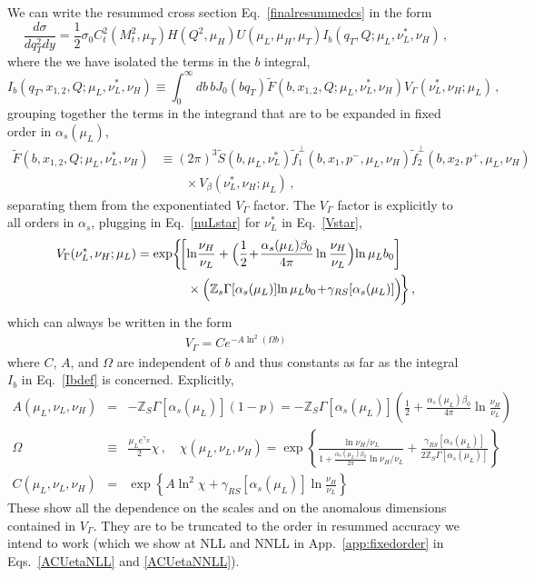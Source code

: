 \documentclass[a4,letterpaper,11pt]{article}
\newcommand{\nn}{\nonumber}
\newcommand{\be}{\begin{equation}}
\newcommand{\ee}{\end{equation}}
\newcommand{\bea}{\begin{eqnarray}}
\newcommand{\eea}{\end{eqnarray}}
\newcommand{\plus}{\!+\!}
\newcommand{\as}{\alpha_s}
\newcommand{\zed}{\mathbb{Z}}
\newcommand{\wt}{\widetilde}
\newcommand{\eq}[1]{Eq.~\eqref{#1}}
\newcommand{\eqs}[2]{Eqs.~\eqref{#1} and \eqref{#2}}
\newcommand{\appx}[1]{App.~\ref{app:#1}}
\begin{document}
We can write the resummed cross section \eq{finalresummedcs} in the form
\be
\label{resummedIb}
\frac{d\sigma}{dq_T^2 dy} = \frac{1}{2}\sigma_0 C_t^2(M_t^2, \mu_T) H(Q^2,\mu_H) U(\mu_L,\mu_H, \mu_T) I_b(q_T,Q;\mu_L,\nu_L^*,\nu_H)\,,
\ee
where the we have isolated the terms in the $b$ integral,
\be
\label{Ibdef}
I_b(q_T,x_{1,2},Q;\mu_L,\nu_L^*,\nu_H) \equiv \int_0^\infty db\,b J_0(bq_T) \wt F(b,x_{1,2},Q;\mu_L,\nu_L^*,\nu_H) V_\Gamma(\nu_L^*,\nu_H;\mu_L)\,,
\ee
grouping together the terms in the integrand that are to be expanded in fixed order in $\as(\mu_L)$,
\begin{align}
\label{fixedorderfactor}
\wt F(b,x_{1,2},Q;\mu_L,\nu_L^*,\nu_H) & \equiv (2\pi)^3\wt S( b ,\mu_L,\nu_L^*) \wt f_1^{\perp}( b, x_1, p^-,\mu_L ,\nu_H) \wt f_2^{\perp}(  b,  x_2,p^+, \mu_L ,\nu_H) \nn \\
&\qquad \times V_\beta(\nu_L^*,\nu_H;\mu_L) \,,
\end{align}
separating them from the exponentiated $V_\Gamma$ factor. The $V_\Gamma$ factor is explicitly to all orders in $\as$, plugging in \eq{nuLstar} for $\nu_L^*$ in \eq{Vstar},
\begin{align}
V_\Gamma(\nu_L^*,\nu_H;\mu_L) &= \exp\biggl\{\! \biggl[ \ln \! \frac{\nu_H}{\nu_L} + \Bigl( \frac{1}{2} \plus \frac{\as(\mu_L)\beta_0}{4\pi} \ln\frac{\nu_H}{\nu_L}\Bigr)\!  \ln\mu_L b_0\biggr]  \\
&\qquad\qquad\times \Bigl( \zed_s \Gamma[\as(\mu_L)] \! \ln\mu_L b_0 \plus  \gamma_{RS}[\as(\mu_L)]\Bigr) \! \biggr\} \, ,  \nn
\end{align}
which can always be written in the form 
\bea \label{VGaussian}
V_\Gamma  =  C e^{ -A \ln^2( \Omega b)}
\eea
where $C$, $A$, and $\Omega$ are independent of $b$ and thus constants as far as the integral $I_b$ in \eq{Ibdef} is concerned. 
Explicitly,
\bea \label{ACUeta}
A(\mu_L,\nu_L,\nu_H) &=& -\zed_S\Gamma[\as(\mu_L)] (1-p)=-\zed_S \Gamma[\as(\mu_L)] \left(\frac12+\frac{\as(\mu_L)\beta_0}{4\pi}\ln \frac{\nu_H}{\nu_L} \right)
\\
\Omega&\equiv& \frac{\mu_L e^{\gamma_E}}{2}\chi\,,\quad \chi(\mu_L,\nu_L,\nu_H) = \exp\left\{ \frac{ \ln \nu_H / \nu_L }{1+\frac{\as(\mu_L)\beta_0}{2\pi}\ln \nu_H / \nu_L }+\frac{\gamma_{RS}[\as(\mu_L)]}{2\zed_S\Gamma[\as(\mu_L)]}\right\}
 \nn \\
C(\mu_L,\nu_L,\nu_H) &=& \exp\left\{ A \ln^2\chi + \gamma_{RS} [\as(\mu_L)] \ln \frac{\nu_H}{\nu_L}\right\}  \nn
\eea
These show all the dependence on the scales and on the anomalous dimensions contained in $V_\Gamma$. They are to be truncated to the order in resummed accuracy we intend to work (which we show at NLL and NNLL in \appx{fixedorder} in \eqs{ACUetaNLL}{ACUetaNNLL}). 
\end{document}
